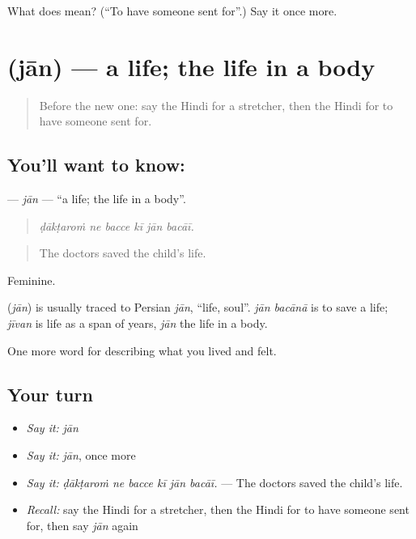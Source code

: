 \begin{tcolorbox}[breakable,colback=teal!4,colframe=teal!35!black,title={Before you move on}]
What does  mean? (\textquotedblleft{}To have someone sent for\textquotedblright{}.) Say it once more.
\end{tcolorbox}
\section[\texorpdfstring{\hi{जान} (jān)}{जान (jān)}]{ (jān) — a life; the life in a body}

\label{lesson:HI-C491-jan}



\begin{quote}
Before the new one: say the Hindi for a stretcher, then the Hindi for to have someone sent for.
\end{quote}

\subsection*{You'll want to know: }
\textbf{} — \emph{jān} — \textquotedblleft{}a life; the life in a body\textquotedblright{}.

\begin{quote}
     
\end{quote}

\begin{quote}
\emph{ḍākṭaroṁ ne bacce kī jān bacāī.}
\end{quote}

\begin{quote}
The doctors saved the child's life.
\end{quote}

Feminine.

\begin{cousinweb}
\textbf{} (\emph{jān}) is usually traced to Persian \emph{jān}, \textquotedblleft{}life, soul\textquotedblright{}. \emph{jān bacānā} is to save a life; \emph{jīvan} is life as a span of years, \emph{jān} the life in a body.
\end{cousinweb}

\begin{grammarlens}[title={What you've built}]
One more word for describing what you lived and felt.
\end{grammarlens}

\subsection*{Your turn}
\begin{itemize}
\raggedright
  \item \emph{Say it:} \emph{jān}
  \item \emph{Say it:} \emph{jān}, once more
  \item \emph{Say it:} \emph{ḍākṭaroṁ ne bacce kī jān bacāī.} — The doctors saved the child's life.
  \item \emph{Recall:} say the Hindi for a stretcher, then the Hindi for to have someone sent for, then say \emph{jān} again
\end{itemize}

